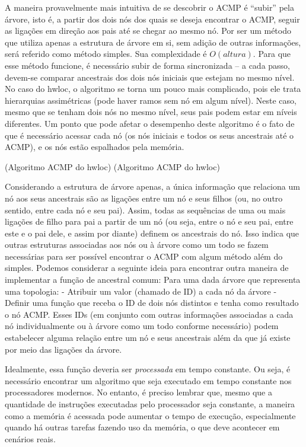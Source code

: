 A maneira provavelmente mais intuitiva de se descobrir o ACMP é ``subir'' pela árvore, isto é, a partir dos dois nós dos quais se deseja encontrar o ACMP,
seguir as ligações em direção aos pais até se chegar ao mesmo nó.
Por ser um método que utiliza apenas a estrutura de árvore em si, sem adição de outras informações, será referido como método simples.
Sua complexidade é $O(altura)$.
Para que esse método funcione, é necessário subir de forma sincronizada -- a cada passo, devem-se comparar ancestrais dos dois nós iniciais que estejam no mesmo nível.
No caso do hwloc, o algoritmo se torna um pouco mais complicado, pois ele trata hierarquias assimétricas (pode haver ramos sem nó em algum nível).
Neste caso, mesmo que se tenham dois nós no mesmo nível, seus pais podem estar em níveis diferentes.
Um ponto que pode afetar o desempenho deste algoritmo é o fato de que é necessário acessar cada nó
(os nós iniciais e todos os seus ancestrais até o ACMP), e os nós estão espalhados pela memória.

(Algoritmo ACMP do hwloc)
(Algoritmo ACMP do hwloc)

Considerando a estrutura de árvore apenas, a única informação que relaciona um nó aos seus ancestrais
são as ligações entre um nó e seus filhos (ou, no outro sentido, entre cada nó e seu pai).
Assim, todas as sequências de uma ou mais ligações de filho para pai a partir de um nó (ou seja,
entre o nó e seu pai, entre este e o pai dele, e assim por diante) definem os ancestrais do nó.
Isso indica que outras estruturas associadas aos nós ou à árvore como um todo se fazem necessárias
para ser possível encontrar o ACMP com algum método além do simples.
Podemos considerar a seguinte ideia para encontrar outra maneira de implementar a função de ancestral comum:
Para uma dada árvore que representa uma topologia:
- Atribuir um valor (chamado de ID) a cada nó da árvore
- Definir uma função \ACMPIDs que receba o ID de dois nós distintos e tenha como resultado o nó ACMP.
Esses IDs (em conjunto com outras informações associadas a cada nó individualmente ou à árvore como um todo conforme necessário)
podem estabelecer alguma relação entre um nó e seus ancestrais além da que já existe por meio das ligações da árvore.

Idealmente, essa função \ACMPIDs deveria ser \textit{processada} em tempo constante.
Ou seja, é necessário encontrar um algoritmo que seja executado em tempo constante nos processadores modernos.
No entanto, é preciso lembrar que, mesmo que a quantidade de instruções executadas pelo processador seja constante,
a maneira como a memória é acessada pode aumentar o tempo de execução, especialmente quando há outras tarefas fazendo uso da memória, o que deve acontecer em cenários reais.

